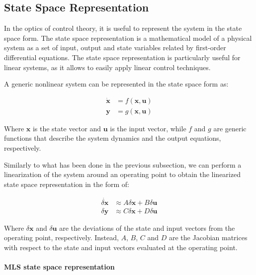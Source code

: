 \subsection{State Space Representation}
\label{subsec:state_space_representation}

In the optics of control theory, it is useful to represent the system in the state space form.
The state space representation is a mathematical model of a physical system as a set of input, output and state variables related by first-order differential equations.
The state space representation is particularly useful for linear systems, as it allows to easily apply linear control techniques.

A generic nonlinear system can be represented in the state space form as:

\begin{equation}
    \begin{aligned}
        \dot{\mathbf{x}} & = f(\mathbf{x}, \mathbf{u}) \\
        \mathbf{y}       & = g(\mathbf{x}, \mathbf{u})
    \end{aligned}
\end{equation}

Where $\mathbf{x}$ is the state vector and $\mathbf{u}$ is the input vector, while $f$ and $g$ are generic functions that describe the system dynamics and the output equations, respectively.

Similarly to what has been done in the previous subsection, we can perform a linearization of the system around an operating point to obtain the linearized state space representation in the form of:

\begin{equation}
    \begin{aligned}
        \dot{\delta\mathbf{x}} & \approx A \delta\mathbf{x} + B \delta\mathbf{u} \\
        \delta\mathbf{y}       & \approx C \delta\mathbf{x} + D \delta\mathbf{u}
    \end{aligned}
\end{equation}

Where $\delta\mathbf{x}$ and $\delta\mathbf{u}$ are the deviations of the state and input vectors from the operating point, respectively.
Instead, $A$, $B$, $C$ and $D$ are the Jacobian matrices with respect to the state and input vectors evaluated at the operating point.

\paragraph{MLS state space representation}

